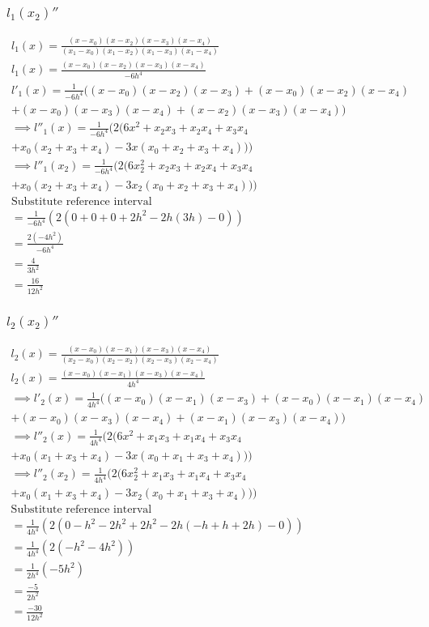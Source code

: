 \subsubsection{$l_{1}(x_{2})''$}
\begin{align*}
    l_{1}(x) = \frac{(x - x_0)(x - x_2)(x - x_3)(x - x_4)}{(x_1 - x_0)(x_1-x_2)(x_1-x_3)(x_1-x_4)} \\
    l_{1}(x) = \frac{(x - x_0)(x - x_2)(x - x_3)(x - x_4)}{-6h^4} \\
    l'_{1}(x) = \frac{1}{-6h^4} ((x - x_0) (x - x_2) (x - x_3) + (x - x_0) (x - x_2) (x - x_4) \\ + (x - x_0) (x - x_3) (x - x_4) + (x - x_2) (x - x_3) (x - x_4)) \\
\implies    l''_{1}(x) = \frac{1}{-6h^4} (2 (6 x^2 + x_2 x_3 + x_2 x_4 + x_3 x_4 \\ + x_0 (x_2 + x_3 + x_4) - 3 x (x_0 + x_2 + x_3 + x_4))) \\
\implies    l''_{1}(x_2) = \frac{1}{-6h^4} (2 (6 x_{2}^2 + x_2 x_3 + x_2 x_4 + x_3 x_4 \\ + x_0 (x_2 + x_3 + x_4) - 3 x_2 (x_0 + x_2 + x_3 + x_4))) \\
\text{Substitute reference interval} \\
= \frac{1}{-6h^4} (2 (0 + 0 + 0 + 2h^2 - 2h (3h) - 0))\\
= \frac{2 (-4h^2)}{-6h^4} \\
= \frac{4}{3h^2} \\
= \frac{16}{12h^2}
\end{align*}


\subsubsection{$l_{2}(x_{2})''$}
\begin{align*}
    l_{2}(x) = \frac{(x - x_0)(x - x_1)(x - x_3)(x - x_4)}{(x_2 - x_0)(x_2 - x_2)(x_2-x_3)(x_2-x_4)} \\
    l_{2}(x) = \frac{(x - x_0)(x - x_1)(x - x_3)(x - x_4)}{4h^4} 
    \\
\implies    l'_{2}(x) = \frac{1}{4h^4} ((x - x_0) (x - x_1) (x - x_3) + (x - x_0) (x - x_1) (x - x_4) \\ + (x - x_0) (x - x_3) (x - x_4) + (x - x_1) (x - x_3) (x - x_4)) 
    \\
\implies    l''_{2}(x) = \frac{1}{4h^4} (2 (6 x^2 + x_1 x_3 + x_1 x_4 + x_3 x_4 \\ + x_0 (x_1 + x_3 + x_4) - 3 x (x_0 + x_1 + x_3 + x_4)))
    \\
    \implies    l''_{2}(x_2) = \frac{1}{4h^4} (2 (6 x_{2}^2 + x_1 x_3 + x_1 x_4 + x_3 x_4 \\ + x_0 (x_1 + x_3 + x_4) - 3 x_2 (x_0 + x_1 + x_3 + x_4)))
    \\
\text{Substitute reference interval} \\
= \frac{1}{4h^4} (2(0 - h^2 - 2h^2 + 2h^2 - 2h(-h + h + 2h) - 0)) \\
= \frac{1}{4h^4} (2( - h^2 - 4h^2 )) \\
= \frac{1}{2h^4} (- 5h^2 ) \\
= \frac{-5}{2h^2} \\
= \frac{-30}{12h^2}
\end{align*}

